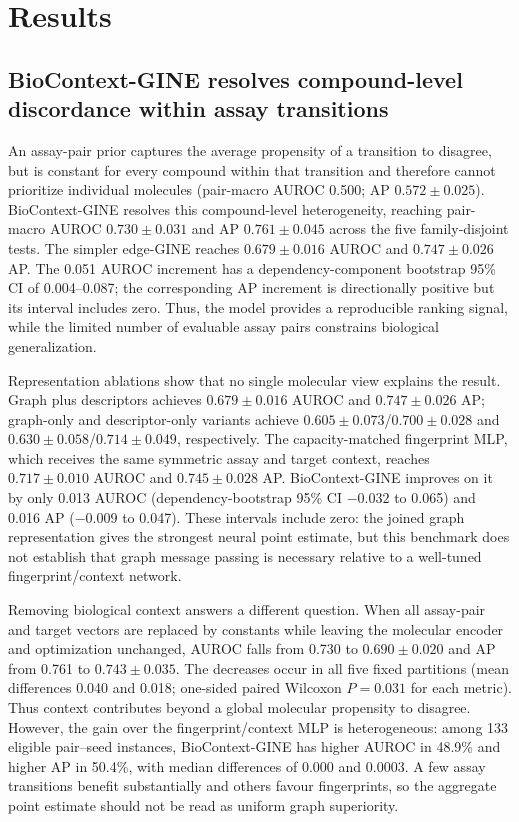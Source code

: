 \documentclass[letterpaper]{article}
\begin{document}
\section{Results}

\subsection{BioContext-GINE resolves compound-level discordance within assay transitions}

An assay-pair prior captures the average propensity of a transition to disagree, but is constant for every compound within that transition and therefore cannot prioritize individual molecules (pair-macro AUROC 0.500; AP $0.572\pm0.025$). BioContext-GINE resolves this compound-level heterogeneity, reaching pair-macro AUROC $0.730\pm0.031$ and AP $0.761\pm0.045$ across the five family-disjoint tests. The simpler edge-GINE reaches $0.679\pm0.016$ AUROC and $0.747\pm0.026$ AP. The 0.051 AUROC increment has a dependency-component bootstrap 95\% CI of 0.004--0.087; the corresponding AP increment is directionally positive but its interval includes zero. Thus, the model provides a reproducible ranking signal, while the limited number of evaluable assay pairs constrains biological generalization.

Representation ablations show that no single molecular view explains the result. Graph plus descriptors achieves $0.679\pm0.016$ AUROC and $0.747\pm0.026$ AP; graph-only and descriptor-only variants achieve $0.605\pm0.073$/$0.700\pm0.028$ and $0.630\pm0.058$/$0.714\pm0.049$, respectively. The capacity-matched fingerprint MLP, which receives the same symmetric assay and target context, reaches $0.717\pm0.010$ AUROC and $0.745\pm0.028$ AP. BioContext-GINE improves on it by only 0.013 AUROC (dependency-bootstrap 95\% CI $-0.032$ to 0.065) and 0.016 AP ($-0.009$ to 0.047). These intervals include zero: the joined graph representation gives the strongest neural point estimate, but this benchmark does not establish that graph message passing is necessary relative to a well-tuned fingerprint/context network.

Removing biological context answers a different question. When all assay-pair and target vectors are replaced by constants while leaving the molecular encoder and optimization unchanged, AUROC falls from 0.730 to $0.690\pm0.020$ and AP from 0.761 to $0.743\pm0.035$. The decreases occur in all five fixed partitions (mean differences 0.040 and 0.018; one-sided paired Wilcoxon $P=0.031$ for each metric). Thus context contributes beyond a global molecular propensity to disagree. However, the gain over the fingerprint/context MLP is heterogeneous: among 133 eligible pair--seed instances, BioContext-GINE has higher AUROC in 48.9\% and higher AP in 50.4\%, with median differences of 0.000 and 0.0003. A few assay transitions benefit substantially and others favour fingerprints, so the aggregate point estimate should not be read as uniform graph superiority.
\end{document}
